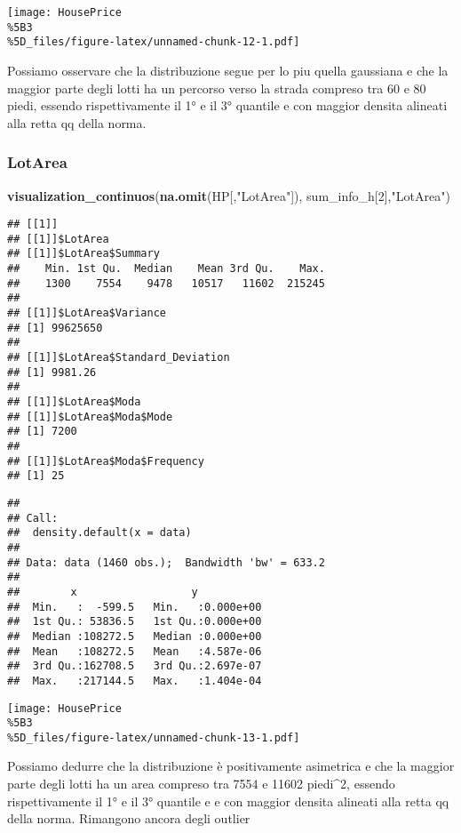 \documentclass[
]{article}
\newenvironment{Shaded}{\begin{snugshade}}{\end{snugshade}}
\newcommand{\DecValTok}[1]{\textcolor[rgb]{0.00,0.00,0.81}{#1}}
\newcommand{\FunctionTok}[1]{\textcolor[rgb]{0.13,0.29,0.53}{\textbf{#1}}}
\newcommand{\NormalTok}[1]{#1}
\newcommand{\StringTok}[1]{\textcolor[rgb]{0.31,0.60,0.02}{#1}}
\begin{document}
\texttt{[image: HousePrice\\\%5B3\\\%5D\_files/figure-latex/unnamed-chunk-12-1.pdf]}

Possiamo osservare che la distribuzione segue per lo piu quella
gaussiana e che la maggior parte degli lotti ha un percorso verso la
strada compreso tra 60 e 80 piedi, essendo rispettivamente il 1° e il 3°
quantile e con maggior densita alineati alla retta qq della norma.

\subsubsection{LotArea}\label{lotarea}

\begin{Shaded}
\begin{Highlighting}[]
\FunctionTok{visualization\_continuos}\NormalTok{(}\FunctionTok{na.omit}\NormalTok{(HP[,}\StringTok{"LotArea"}\NormalTok{]), sum\_info\_h[}\DecValTok{2}\NormalTok{],}\StringTok{"LotArea"}\NormalTok{)}
\end{Highlighting}
\end{Shaded}

\begin{verbatim}
## [[1]]
## [[1]]$LotArea
## [[1]]$LotArea$Summary
##    Min. 1st Qu.  Median    Mean 3rd Qu.    Max. 
##    1300    7554    9478   10517   11602  215245 
## 
## [[1]]$LotArea$Variance
## [1] 99625650
## 
## [[1]]$LotArea$Standard_Deviation
## [1] 9981.26
## 
## [[1]]$LotArea$Moda
## [[1]]$LotArea$Moda$Mode
## [1] 7200
## 
## [[1]]$LotArea$Moda$Frequency
## [1] 25
\end{verbatim}

\begin{verbatim}
## 
## Call:
##  density.default(x = data)
## 
## Data: data (1460 obs.);  Bandwidth 'bw' = 633.2
## 
##        x                  y            
##  Min.   :  -599.5   Min.   :0.000e+00  
##  1st Qu.: 53836.5   1st Qu.:0.000e+00  
##  Median :108272.5   Median :0.000e+00  
##  Mean   :108272.5   Mean   :4.587e-06  
##  3rd Qu.:162708.5   3rd Qu.:2.697e-07  
##  Max.   :217144.5   Max.   :1.404e-04
\end{verbatim}

\texttt{[image: HousePrice\\\%5B3\\\%5D\_files/figure-latex/unnamed-chunk-13-1.pdf]}

Possiamo dedurre che la distribuzione è positivamente asimetrica e che
la maggior parte degli lotti ha un area compreso tra 7554 e 11602
piedi\^{}2, essendo rispettivamente il 1° e il 3° quantile e e con
maggior densita alineati alla retta qq della norma. Rimangono ancora
degli outlier
\end{document}
